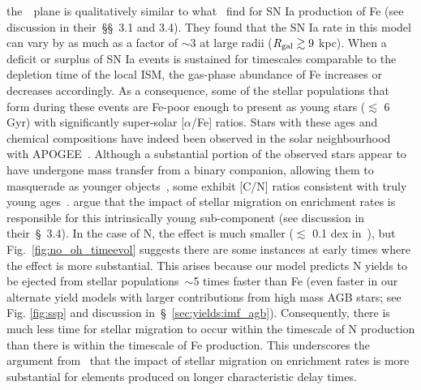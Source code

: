 \documentclass[ms.tex]{subfiles}
\begin{document}
the~\ohno~plane is qualitatively similar to what~\citet{Johnson2021} find for
SN Ia production of Fe (see discussion in their~\S\S~3.1 and 3.4).
They found that the SN Ia rate in this model can vary by as much as a factor of
$\sim$3 at large radii ($R_\text{gal} \gtrsim 9$ kpc).
When a deficit or surplus of SN Ia events is sustained for timescales
comparable to the depletion time of the local ISM, the gas-phase abundance of
Fe increases or decreases accordingly.
As a consequence, some of the stellar populations that form during these
events are Fe-poor enough to present as young stars ($\lesssim$ 6 Gyr) with
significantly super-solar [$\alpha$/Fe] ratios.
Stars with these ages and chemical compositions have indeed been observed in
the solar neighbourhood with APOGEE~\citep{Chiappini2015, Martig2015,
Martig2016, Warfield2021}.
Although a substantial portion of the observed stars appear to have undergone
mass transfer from a binary companion, allowing them to masquerade as younger
objects~\citep{Jofre2016, Yong2016, Izzard2018, SilvaAguirre2018, Miglio2021},
some exhibit [C/N] ratios consistent with truly young ages~\citep{Hekker2019}.
\citet{Johnson2021} argue that the impact of stellar migration on enrichment
rates is responsible for this intrinsically young sub-component (see
discussion in their~\S~3.4).
In the case of N, the effect is much smaller ($\lesssim$ 0.1 dex in~\no),
but Fig.~\ref{fig:no_oh_timeevol} suggests there are some instances at early
times where the effect is more substantial.
This arises because our model predicts N yields to be ejected from stellar
populations~$\sim$5 times faster than Fe (even faster in our alternate yield
models with larger contributions from high mass AGB stars; see Fig.
\ref{fig:ssp} and discussion in~\S~\ref{sec:yields:imf_agb}).
Consequently, there is much less time for stellar migration to occur within the
timescale of N production than there is within the timescale of Fe production.
This underscores the argument from~\citet{Johnson2021} that the impact of
stellar migration on enrichment rates is more substantial for elements
produced on longer characteristic delay times.
\end{document}
